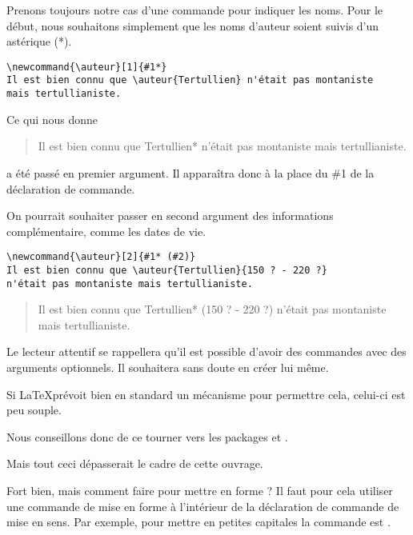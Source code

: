 Prenons toujours notre cas d'une commande pour indiquer les noms. Pour le début, nous souhaitons simplement que les noms d'auteur soient suivis d'un astérique (*).

\begin{verbatim}
\newcommand{\auteur}[1]{#1*}
Il est bien connu que \auteur{Tertullien} n'était pas montaniste
mais tertullianiste.
\end{verbatim}

\newcommand{\auteur}[1]{#1*}

Ce qui nous donne
\begin{quotation}
Il est bien connu que \auteur{Tertullien} n'était pas montaniste mais tertullianiste.
\end{quotation}


 a été passé en premier argument. Il apparaîtra donc à la place du \#1 de la déclaration de commande.

On pourrait souhaiter passer en second argument des informations complémentaire, comme les dates de vie.

\begin{verbatim}
\newcommand{\auteur}[2]{#1* (#2)}
Il est bien connu que \auteur{Tertullien}{150 ? - 220 ?}
n'était pas montaniste mais tertullianiste.
\end{verbatim}

\renewcommand{\auteur}[2]{#1* (#2)}

\begin{quotation}
Il est bien connu que \auteur{Tertullien}{150 ? - 220 ?}
n'était pas montaniste mais tertullianiste.
\end{quotation}

\begin{plusloins}
Le lecteur attentif se rappellera  qu'il est possible d'avoir des commandes avec des arguments optionnels. Il souhaitera sans doute en créer lui même.

Si \LaTeX prévoit bien en standard un mécanisme pour permettre cela, celui-ci est  peu souple. 

Nous conseillons donc de ce tourner vers les packages  et .

Mais tout ceci dépasserait le cadre de cette ouvrage.
\end{plusloins}

Fort bien, mais comment faire pour mettre en forme ? Il faut pour cela utiliser une commande de mise en forme à l'intérieur de la déclaration de commande de mise en sens. Par exemple, pour mettre en petites capitales la commande est .

